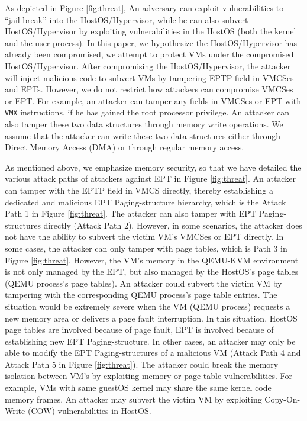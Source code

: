 As depicted in Figure \ref{fig:threat}, 
An adversary can exploit vulnerabilities to ``jail-break'' into the HostOS/Hypervisor, while he can also subvert HostOS/Hypervisor by exploiting vulnerabilities in the HostOS (both the kernel and the user process).
In this paper, we hypothesize the HostOS/Hypervisor has already been compromised, we attempt to protect VMs under the compromised HostOS/Hypervisor. 
After compromising the HostOS/Hypervisor, the attacker will inject malicious code to subvert VMs by tampering EPTP field in VMCSes and EPTs.
However, we do not restrict how attackers can compromise VMCSes or EPT. 
For example, an attacker can tamper any fields in VMCSes or EPT with \verb|VMX| instructions, if he has gained the root processor privilege. An attacker can also tamper these two data structures through memory write operations. We assume that the attacker can write these two data structures either through Direct Memory Access (DMA) or through regular memory access. 

As mentioned above, we emphasize memory security, so that we have detailed the various attack paths of attackers against EPT in Figure \ref{fig:threat}.
An attacker can tamper with the EPTP field in VMCS directly, thereby establishing a dedicated and malicious EPT Paging-structure hierarchy, which is the Attack Path 1 in Figure \ref{fig:threat}. 
The attacker can also tamper with EPT Paging-structures directly (Attack Path 2).
However, in some scenarios, the attacker does not have the ability to subvert the victim VM's VMCSes or EPT directly. 
In some cases, the attacker can only tamper with page tables, which is Path 3 in Figure \ref{fig:threat}. However, the VM's memory in the QEMU-KVM environment is not only managed by the EPT, but also managed by the HostOS's page tables (QEMU process's page tables). An attacker could subvert the victim VM by tampering with the corresponding QEMU process's page table entries. The situation would be extremely severe when the VM (QEMU process) requests a new memory area or delivers a page fault interruption. In this situation, HostOS page tables are involved because of page fault, EPT is involved because of establishing new EPT Paging-structure. 
In other cases,  
an attacker may only be able to modify the EPT Paging-structures of a malicious VM (Attack Path 4 and Attack Path 5 in Figure \ref{fig:threat}). 
The attacker could break the memory isolation between VM's by exploiting memory or page table vulnerabilities. For example, VMs with same guestOS kernel may share the same kernel code memory frames. An attacker may subvert the victim VM by exploiting Copy-On-Write (COW) vulnerabilities in HostOS. 

